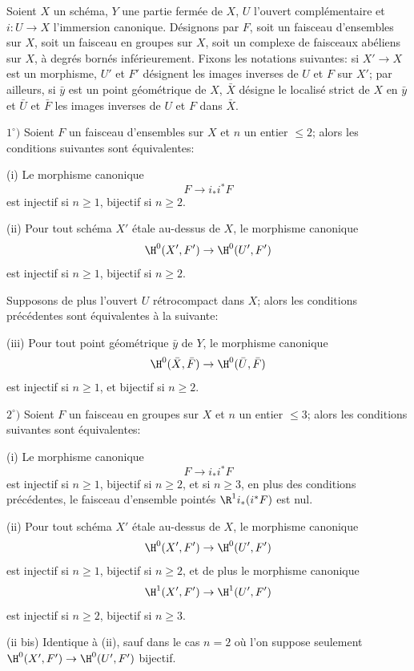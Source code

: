 \enlargethispage{\baselineskip}%
\begin{proposition} \label{XIV.1.1}
Soient $X$ un sch\'ema, $Y$ une partie ferm\'ee de $X$, $U$ l'ouvert compl\'ementaire et $i:U\to X$ l'immersion canonique. D\'esignons par $F$, soit un faisceau d'ensembles sur $X$, soit un faisceau en groupes sur $X$, soit un complexe de faisceaux ab\'eliens sur $X$, \`a degr\'es born\'es inf\'erieurement. Fixons les notations suivantes: si $X'\to X$ est un morphisme, $U'$ et $F'$ d\'esignent les images inverses de $U$ et $F$ sur $X'$; par ailleurs, si $\bar{y}$ est un point g\'eom\'etrique de $X$, $\bar{X}$ d\'esigne le localis\'e strict de $X$ en $\bar{y}$ et $\bar{U}$ et $\bar{F}$ les images inverses de $U$ et $F$ dans $\bar{X}$.

$1^\circ)$ Soient $F$ un faisceau d'ensembles sur $X$ et $n$ un entier $\leq 2$; alors les conditions suivantes sont \'equivalentes:

\textup{(i)} Le morphisme canonique
$$F\to i_*i^*F$$
est injectif si $n\geq 1$, bijectif si $n\geq 2$.

\textup{(ii)} Pour tout sch\'ema $X'$ \'etale au-dessus de $X$, le morphisme canonique
$$
\H^0(X', F')\to \H^0(U', F')
$$
est injectif si $n\geq 1$, bijectif si $n\geq 2$.

Supposons de plus l'ouvert $U$ r\'etrocompact dans $X$; alors les conditions pr\'ec\'edentes sont \'equivalentes \`a la suivante:

\textup{(iii)} Pour tout point g\'eom\'etrique $\bar{y}$ de $Y$, le morphisme canonique
$$
\H^0(\bar{X}, \bar{F})\to \H^0(\bar{U}, \bar{F})$$
est injectif si $n\geq 1$, et bijectif si $n\geq 2$.

$2^\circ)$ Soient $F$ un faisceau en groupes sur $X$ et $n$ un entier $\leq 3$; alors les conditions suivantes sont \'equivalentes:

\textup{(i)} Le morphisme canonique
$$F\to i_*i^*F$$
est injectif si $n\geq 1$, bijectif si $n\geq 2$, et si $n\geq 3$, en plus des conditions pr\'ec\'edentes, le faisceau d'ensemble point\'es $\R^1i_*(i^*F)$ est nul.

\textup{(ii)} Pour tout sch\'ema $X'$ \'etale au-dessus de $X$, le morphisme canonique
$$
\H^0(X', F')\to \H^0(U', F')
$$
est injectif si $n\geq 1$, bijectif si $n\geq 2$, et de plus le morphisme canonique
$$
\H^1(X', F')\to \H^1(U', F')
$$
est injectif si $n\geq 2$, bijectif si $n\geq 3$.

\textup{(ii bis)} Identique \`a \textup{(ii)}, sauf dans le cas $n=2$ o\`u l'on suppose seulement $\H^0(X', F')\to \H^0(U', F')$ bijectif.


\end{proposition}
